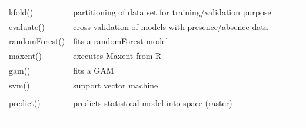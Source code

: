 \documentclass[10pt,landscape]{article}
\makeatletter
\renewcommand{\section}{\@startsection{section}{1}{0mm}%
                                {-1ex plus -.5ex minus -.2ex}%
                                {0.5ex plus .2ex}%
                                {\normalfont\large\bfseries}}
\makeatother
\begin{document}
\begin{multicols}{3}
\bigskip

\begin{tabular}{@{}p{\the\MyLen}%
                @{}p{\linewidth-\the\MyLen}@{}}
kfold() & partitioning of data set for training/validation purpose\\
evaluate() & cross-validation of models with presence/absence data\\               
randomForest() & fits a randomForest model  \\
maxent() & executes Maxent from R\\
gam() & fits a GAM \\
svm() & support vector machine \\
&  \\                
predict() & predicts statistical model into space (raster) \\

 & \\
\end{tabular}

\bigskip

\rule{0.32\textwidth}{0.4pt}
\scriptsize


% 
% 
% 


\end{multicols}
\end{document}
